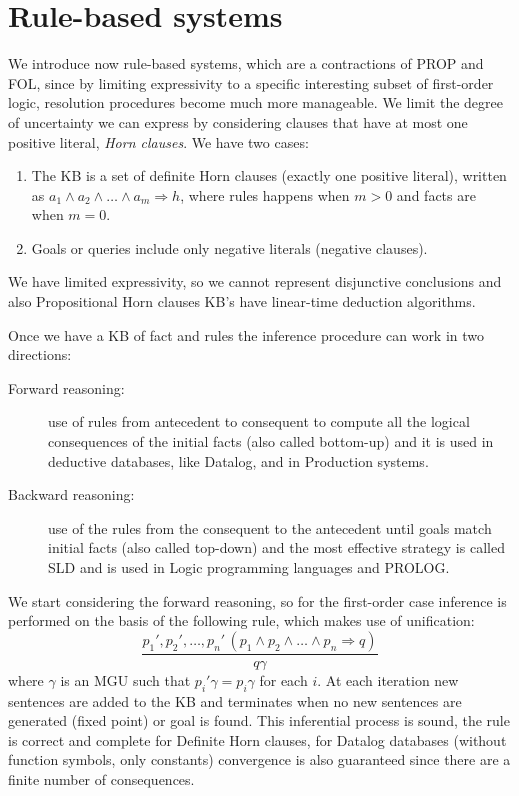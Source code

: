 \chapter{Rule-based systems}
We introduce now rule-based systems, which are a contractions of PROP and FOL, since 
by limiting expressivity to a specific interesting subset of first-order logic, resolution
procedures become much more manageable.\newline
We limit the degree of uncertainty we can express by considering clauses that have at
most one positive literal, \emph{Horn clauses}.\newline
We have two cases:
\begin{enumerate}
   \item The KB is a set of definite Horn clauses (exactly one positive literal),
	 written as $a_1 \land a_2 \land \dots \land a_m \Rightarrow h$, where rules
	 happens when $m > 0$ and facts are when $m = 0$.
   \item Goals or queries include only negative literals (negative clauses).
\end{enumerate}
We have limited expressivity, so we cannot represent disjunctive conclusions and also 
Propositional Horn clauses KB's have linear-time deduction algorithms.

Once we have a KB of fact and rules the inference procedure can work in two directions:
\begin{description}
   \item [Forward reasoning: ] use of rules from antecedent to consequent to compute
          all the logical consequences of the initial facts (also called bottom-up) and 
	  it is used in deductive databases, like Datalog, and in Production systems.
   \item [Backward reasoning: ] use of the rules from the consequent to the antecedent
          until goals match initial facts (also called top-down) and the most effective
	  strategy is called SLD and is used in Logic programming languages and PROLOG.
\end{description}
We start considering the forward reasoning, so for the first-order case inference 
is performed on the basis of the following rule, which makes use of unification:
\[ \frac{p_1', p_2', \dots, p_n' \, (p_1 \land p_2 \land \dots \land p_n \Rightarrow q)}
        {q \gamma} \]
where $\gamma$ is an MGU such that $p_i' \gamma = p_i \gamma$ for each $i$.
At each iteration new sentences are added to the KB and terminates when no 
new sentences are generated (fixed point) or goal is found.\newline
This inferential process is sound, the rule is correct and complete for Definite Horn clauses,
for Datalog databases (without function symbols, only constants) convergence is
also guaranteed since there are a finite number of consequences.

